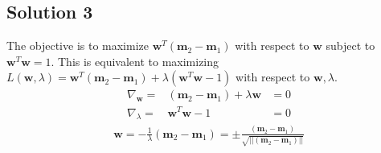 \documentclass[12pt,a4paper]{ctexart}
\begin{document}
\begin{flushleft}
\section*{Solution 3}
The objective is to maximize $\textbf{w}^{T}( \textbf{m}_{2} - \textbf{m}_{1})$ with respect to $\textbf{w}$ subject to $\textbf{w}^{T} \textbf{w} = 1$.  This is equivalent to maximizing $L(\textbf{w}, \lambda) = \textbf{w}^{T}( \textbf{m}_{2} - \textbf{m}_{1}) + \lambda (\textbf{w}^{T} \textbf{w} - 1)$ with respect to $\textbf{w}, \lambda$.
\begin{eqnarray*}
\nabla_{\textbf{w}} =& (\textbf{m}_{2} - \textbf{m}_{1}) + \lambda \textbf{w} &= 0\\
\nabla_{\lambda}=&\textbf{w}^{T} \textbf{w} - 1&= 0
\end{eqnarray*}
\begin{eqnarray*}
\textbf{w} = - \frac{1}{\lambda}  (\textbf{m}_{2} - \textbf{m}_{1}) = \pm \frac{(\textbf{m}_{2} - \textbf{m}_{1})}{\sqrt{||(\textbf{m}_{2} - \textbf{m}_{1}) ||}}
\end{eqnarray*}
\end{flushleft}
\end{document}
